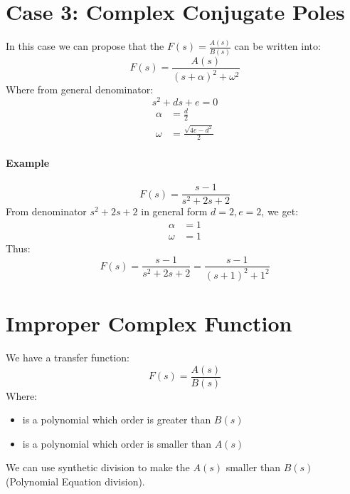 \section{Case 3: Complex Conjugate Poles}
\begin{tcolorbox}[title=Method]
In this case we can propose that the \(F(s) = \frac{A(s)}{B(s)}\) can be written into:
\[
F(s) = \frac{A(s)}{(s+\alpha)^2+\omega^2}
\]
Where from general denominator:
\[
s^2 + ds + e = 0
\]
\[
\begin{split}
	\alpha &= \frac{d}{2} \\
	\omega &= \frac{\sqrt{4e-d^2}}{2}
\end{split}
\]
\end{tcolorbox}

\paragraph{Example}
\[
F(s) = \frac{s-1}{s^2+2s+2}
\]
From denominator \(s^2+2s+2\) in general form \(d = 2, e = 2\), we get:
\[
\begin{split}
	\alpha &= 1 \\
	\omega &= 1
\end{split}
\]
Thus:
\[\boxed{
	F(s) = \frac{s-1}{s^2+2s+2} = \frac{s-1}{(s+1)^2+1^2}}
\]
\section{Improper Complex Function}
\begin{tcolorbox}[title=Method]
We have a transfer function:
\[
F(s) = \frac{A(s)}{B(s)}
\]
Where:
\begin{itemize}
	\item { is a polynomial which order is greater than \(B(s)\)}
	\item { is a polynomial which order is smaller than \(A(s)\)}
\end{itemize}
We can use synthetic division to make the \(A(s)\) smaller than \(B(s)\) (Polynomial Equation division).
\end{tcolorbox}